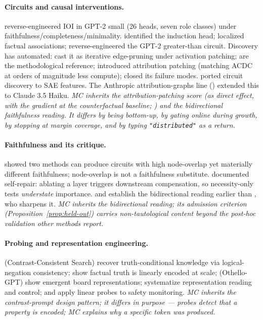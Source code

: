 \documentclass[10pt]{article}
\begin{document}
\paragraph{Circuits and causal interventions.} \citet{wang2022interpretability} reverse-engineered IOI in GPT-2 small (26 heads, seven role classes) under faithfulness/completeness/minimality. \citet{olsson2022induction} identified the induction head; \citet{meng2022rome} localized factual associations; \citet{hanna2023greater} reverse-engineered the GPT-2 greater-than circuit. Discovery has automated: \citet{conmy2023acdc} cast it as iterative edge-pruning under activation patching; \citet{heimersheim2024patching} are the methodological reference; \citet{syed2024attribution} introduced attribution patching (matching ACDC at orders of magnitude less compute); \citet{kramar2024atp} closed its failure modes. \citet{marks2024sparse} ported circuit discovery to SAE features. The Anthropic attribution-graphs line (\citealp{ameisen2025circuit,lindsey2025biology}) extended this to Claude 3.5 Haiku. \emph{MC inherits the attribution-patching score (as direct effect, with the gradient at the counterfactual baseline; \citealp{nanda2023attribution}) and the bidirectional faithfulness reading. It differs by being bottom-up, by gating online during growth, by stopping at margin coverage, and by typing \texttt{"distributed"} as a return.}

\paragraph{Faithfulness and its critique.} \citet{hanna2024faithfulness} showed two methods can produce circuits with high node-overlap yet materially different faithfulness; node-overlap is not a faithfulness substitute. \citet{mcgrath2023hydra} documented self-repair: ablating a layer triggers downstream compensation, so necessity-only tests \emph{understate} importance. \citet{wang2022interpretability} and \citet{heimersheim2024patching} establish the bidirectional reading earlier than \citet{hanna2024faithfulness}, who sharpens it. \emph{MC inherits the bidirectional reading; its admission criterion (Proposition~\ref{prop:held-out}) carries non-tautological content beyond the post-hoc validation other methods report.}

\paragraph{Probing and representation engineering.} \citet{burns2022discovering} (Contrast-Consistent Search) recover truth-conditional knowledge via logical-negation consistency; \citet{marks2023geometry} show factual truth is linearly encoded at scale; \citet{li2023emergent} (Othello-GPT) show emergent board representations; \citet{zou2023representation} systematize representation reading and control; \citet{macdiarmid2024sleeper} and \citet{goldowsky2025deception} apply linear probes to safety monitoring. \emph{MC inherits the contrast-prompt design pattern; it differs in purpose --- probes detect that a property is encoded; MC explains why a specific token was produced.}
\end{document}
